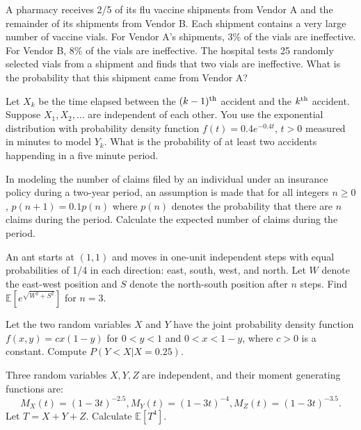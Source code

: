 \begin{problem}    A pharmacy receives 2/5 of its flu vaccine shipments from Vendor A and the remainder of its shipments from Vendor B. Each shipment contains a very large number of vaccine vials. For Vendor A’s shipments, 3\% of the vials are ineffective. For Vendor B, 8\% of the vials are ineffective. The hospital tests 25 randomly selected vials from a shipment and finds that two vials are ineffective. What is the probability that this shipment came from Vendor A?
\end{problem}

\begin{problem}     Let $X_k$ be the time elapsed between the $(k-1)^{\rm th}$ accident and the $k^{\rm th}$ accident. Suppose $X_1, X_2, \ldots $ are independent of each other. You use
    the exponential distribution with probability density function $f(t) = 0.4e^{-0.4t}$, $t>0$ measured in minutes to model $Y_k$. What is the probability of at least two accidents happending in a five minute period.
\end{problem}

\begin{problem}   In modeling the number of claims filed by an individual under an insurance policy during a two-year period, an assumption is made that for all integers $n \geq 0$, $p(n + 1) = 0.1p(n)$ where $p(n)$ denotes the probability that there are $n$ claims during the period. Calculate the expected number of claims during the period.    
\end{problem}

\begin{problem}    An ant starts at $(1,1)$ and moves in one-unit independent steps with equal probabilities of 1/4 in each direction: east, south, west, and north. Let $W$ denote the east-west position and $S$ denote the north-south position after $n$ steps. Find $\mathbb{E}[e^{\sqrt{W^2+S^2}}]$ for $n=3$.
\end{problem}

\begin{problem}    Let the two random variables $X$ and $Y$ have the joint probability density function $f(x,y)=cx(1-y)$ for $0<y<1$ and $0<x<1-y$, where $c>0$ is a constant. Compute $P(Y<X|X=0.25)$.
\end{problem}

   
\begin{problem}     Three random variables $X, Y, Z$ are independent, and their moment generating functions are:
    $$M_X(t) = (1-3t)^{-2.5}, M_Y(t) = (1-3t)^{-4}, M_Z(t) = (1-3t)^{-3.5}.$$
    Let $T=X+Y+Z$. Calculate $\mathbb{E}[T^4]$.
\end{problem}

